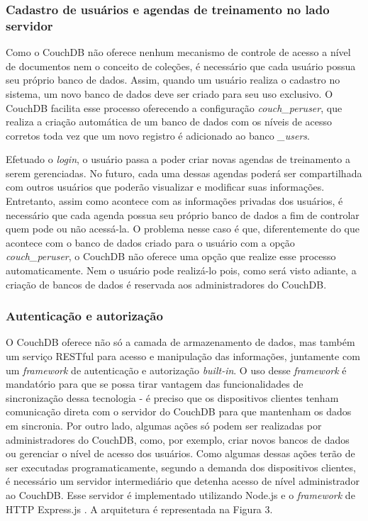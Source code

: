 \documentclass[
	article,			%
	11pt,				%
	oneside,			%
	a4paper,			%
	english,			%
	brazil,				%
	sumario=tradicional
	]{abntex2}
\begin{document}
\subsubsection{Cadastro de usuários e agendas de treinamento no lado servidor}

Como o CouchDB não oferece nenhum mecanismo de controle de acesso a nível de documentos nem o conceito de coleções, é necessário que cada usuário possua seu próprio banco de dados. Assim, quando um usuário realiza o cadastro no sistema, um novo banco de dados deve ser criado para seu uso exclusivo. O CouchDB facilita esse processo oferecendo a configuração \textit{couch\_peruser}, que realiza a criação automática de um banco de dados com os níveis de acesso corretos toda vez que um novo registro é adicionado ao banco \textit{\_users}.

Efetuado o \textit{login}, o usuário passa a poder criar novas agendas de treinamento a serem gerenciadas. No futuro, cada uma dessas agendas poderá ser compartilhada com outros usuários que poderão visualizar e modificar suas informações. Entretanto, assim como acontece com as informações privadas dos usuários, é necessário que cada agenda possua seu próprio banco de dados a fim de controlar quem pode ou não acessá-la. O problema nesse caso é que, diferentemente do que acontece com o banco de dados criado para o usuário com a opção \textit{couch\_peruser}, o CouchDB não oferece uma opção que realize esse processo automaticamente. Nem o usuário pode realizá-lo pois, como será visto adiante, a criação de bancos de dados é reservada aos administradores do CouchDB.

\subsubsection{Autenticação e autorização}

O CouchDB oferece não só a camada de armazenamento de dados, mas também um serviço RESTful para acesso e manipulação das informações, juntamente com um \textit{framework} de autenticação e autorização \textit{built-in}. O uso desse \textit{framework} é mandatório para que se possa tirar vantagem das funcionalidades de sincronização dessa tecnologia - é preciso que os dispositivos clientes tenham comunicação direta com o servidor  do CouchDB para que mantenham os dados em sincronia. Por outro lado, algumas ações só podem ser realizadas por administradores do CouchDB, como, por exemplo, criar novos bancos de dados ou gerenciar o nível de acesso dos usuários. Como algumas dessas ações terão de ser executadas programaticamente, segundo a demanda dos dispositivos clientes, é necessário um servidor intermediário que detenha acesso de nível administrador ao CouchDB. Esse servidor é implementado utilizando Node.js \cite{node-2017} e o \textit{framework} de HTTP Express.js \cite{express-2017}. A arquitetura é representada na Figura 3.
\end{document}
